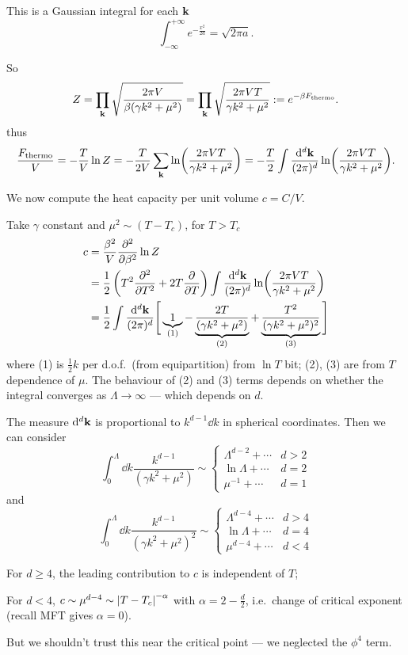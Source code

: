 \documentclass[a4paper,11pt]{article}
\begin{document}
	This is a Gaussian integral for each $\vb k$ 
	\[
		\int_{-\infty}^{+\infty} e ^{- \frac{x^2}{2a}} = \sqrt{2 \pi a}.
	\]
	
	So
	\[
		Z = \prod _{\vb k} \sqrt{\frac{2 \pi V}{\beta (\gamma k^2 + \mu^2)}} = \prod _{\vb k} \sqrt{\frac{2 \pi V T}{\gamma k^2 + \mu^2}} := e ^{- \beta F _{\text{thermo}}}.
	\]
	thus
	\[
		\frac{F _{\text{thermo}}}{V} = - \frac{T}{V} \ln Z = - \frac{T}{2V} \sum _{\vb k} \ln(\frac{2 \pi V T}{\gamma k^2 + \mu^2}) = - \frac{T}{2} \int \frac{\dd[d]{\vb k}}{(2\pi)^d} \ln(\frac{2 \pi V T}{\gamma k^2 + \mu^2}).
	\]
	
	We now compute the heat capacity per unit volume $c = C/V$.

	Take $\gamma$ constant and $\mu^2 \sim (T - T_c)$, for $T > T_c$
	\begin{align*}
		c & = \frac{\beta^2}{V} \pdv[2]{\beta} \ln Z\\
		& = \frac{1}{2} \left( T^2 \pdv[2]{T} + 2 T \pdv{T} \right) \int \frac{\dd[d]{\vb k}}{(2 \pi)^d}\ln(\frac{2 \pi V T}{\gamma k^2 + \mu^2})\\
		& = \frac{1}{2} \int \frac{\dd[d]{\vb k}}{(2 \pi)^d} \Bigg[ \underbrace{1}_{(1)} - \underbrace{\frac{2T}{(\gamma k^2 + \mu^2)}}_{(2)} + \underbrace{\frac{T^2}{(\gamma k^2 + \mu^2)^2}}_{(3)} \Bigg]
	\end{align*}
	where (1) is $\frac{1}{2} k$ per d.o.f.\ (from equipartition) from $\ln T$ bit; (2), (3) are from $T$ dependence of $\mu$. The behaviour of (2) and (3) terms depends on whether the integral converges as $\Lambda \to \infty$ --- which depends on $d$.

	The measure $\dd[d]{\vb k}$ is proportional to $k ^{d-1} \dd{k}$ in spherical coordinates. Then we can consider
	\[
		\int_{0}^{\Lambda} \dd{k} \frac{k ^{d-1}}{(\gamma k^2 + \mu^2)} \sim \begin{cases}
			\Lambda ^{d-2} + \cdots & d>2\\
			\ln \Lambda + \cdots & d = 2\\
			\mu^{-1} + \cdots & d = 1
		\end{cases}
	\]
	and
	\[
		\int_{0}^{\Lambda} \dd{k} \frac{k ^{d-1}}{(\gamma k^2 + \mu^2)^2} \sim \begin{cases}
			\Lambda ^{d-4} + \cdots & d>4\\
			\ln \Lambda + \cdots & d = 4\\
			\mu^{d-4} + \cdots & d < 4
		\end{cases}
	\]
	
	For $d \geq 4$, the leading contribution to $c$ is independent of $T$;
	
	For $d < 4$, $c \sim \mu ^{d-4} \sim \abs{T - T_c}^{-\alpha}$ with $\alpha = 2 - \frac{d}{2}$, i.e.\ change of critical exponent (recall MFT gives $\alpha = 0$).

	But we shouldn't trust this near the critical point --- we neglected the $\phi^4$ term.


	
	
	
\end{document}
